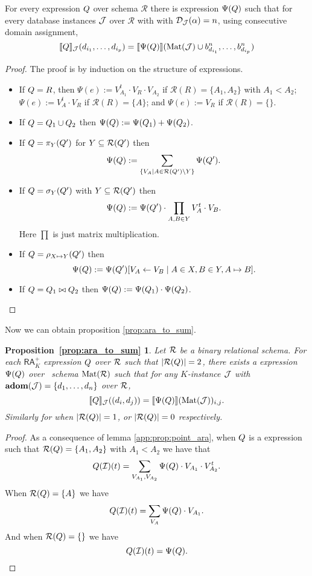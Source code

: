 \begin{lemma}\label{app:prop:point_ara}
For every \rak expression $Q$ over schema $\mathcal{R}$ there is \langsum expression $\Psi(Q)$ such that for every database instances $\mathcal{J}$ over $\mathcal{R}$ with with $\mathcal{D}_{\mathcal{J}}(\alpha) = n$,
using consecutive domain assignment, 
$$
\llbracket Q \rrbracket_{\mathcal{J}}(d_{i_1},\ldots,d_{i_p})=\llbracket \Psi(Q) \rrbracket(\text{Mat}(\mathcal{J})\cup b_{d_{i_1}}^{n},\ldots,b_{d_{i_p}}^{n})
$$
\end{lemma}
\begin{proof} The proof is by induction on the structure of expressions.

\begin{itemize}
\item If $Q=R$, then $\Psi(e):=V_{A_1}^t\cdot V_R\cdot V_{A_2}$ if $\mathcal{R}(R)=\{A_1,A_2\}$ with $A_1<A_2$; 
$\Psi(e):=V_A^t\cdot V_R$ if $\mathcal{R}(R)=\{A\}$; and 
$\Psi(e):=V_R$ if $\mathcal{R}(R)=\{\}$.
\item If $Q=Q_1\cup Q_2$ then
$\Psi(Q):=\Psi(Q_1) + \Psi(Q_2)$.
\item If $Q=\pi_{Y}(Q')$ for $Y\subseteq \mathcal{R}(Q')$ then
$$
\Psi(Q):=\sum_{\{V_A\mid A\in \mathcal{R}(Q')\setminus Y\}}\Psi(Q').
 $$
\item If $Q=\sigma_{Y}(Q')$ with $Y\subseteq\mathcal{R}(Q')$ then
$$
 \Psi(Q):=\Psi(Q')\cdot\prod_{A,B\in Y} V_{A}^t\cdot V_{B}.
$$
Here $\prod$ is just matrix multiplication.
\item If $Q=\rho_{X\mapsto Y}(Q')$ then
$$\Psi(Q):=\Psi(Q')[V_A\gets V_B\mid A\in X, B\in Y, A\mapsto B].$$
\item If $Q=Q_1\bowtie Q_2$ then
$\Psi(Q):=\Psi(Q_1)\cdot \Psi(Q_2)$.
\end{itemize}
\end{proof}

Now we can obtain proposition \ref{prop:ara_to_sum}.

\newtheorem*{ARATOSUM}{Proposition~\ref{prop:ara_to_sum}}

\begin{ARATOSUM}
  Let $\mathcal{R}$ be a binary relational schema. For each $\mathsf{RA}_{K}^+$  expression $Q$ over $\mathcal{R}$  such that $|\mathcal{R}(Q)| = 2$, there exists a \langsum  expression $\Psi(Q)$ over \lang \ schema $\text{Mat}(\mathcal{R})$ such that for any $K$-instance $\mathcal{J}$ with $\mathbf{adom}(\mathcal{J}) = \{d_1, \ldots, d_n\}$ over $\mathcal{R}$,
	$$
	\llbracket Q \rrbracket_{\mathcal{J}}((d_i, d_j))=\llbracket \Psi(Q) \rrbracket(\text{Mat}(\mathcal{J}))_{i,j}.
	$$
	Similarly for when $|\mathcal{R}(Q)| = 1$, or $|\mathcal{R}(Q)| = 0$ respectively.
\end{ARATOSUM}
\begin{proof}
As a consequence of lemma \ref{app:prop:point_ara}, when $Q$ is a \rak expression 
such that $\mathcal{R}(Q)=\{A_1,A_2\}$ with $A_1<A_2$ we have that 
$$
Q(\mathcal{I})(t)=
\sum_{V_{A_1},V_{A_2}}\Psi(Q)\cdot V_{A_1}\cdot V_{A_2}^t.
$$
When $\mathcal{R}(Q)=\{A\}$ we have
$$
Q(\mathcal{I})(t)=
\sum_{V_{A}}\Psi(Q)\cdot V_{A_1}.
$$
And when $\mathcal{R}(Q)=\{\}$ we have
$$
Q(\mathcal{I})(t)=\Psi(Q).
$$

\end{proof}
 

